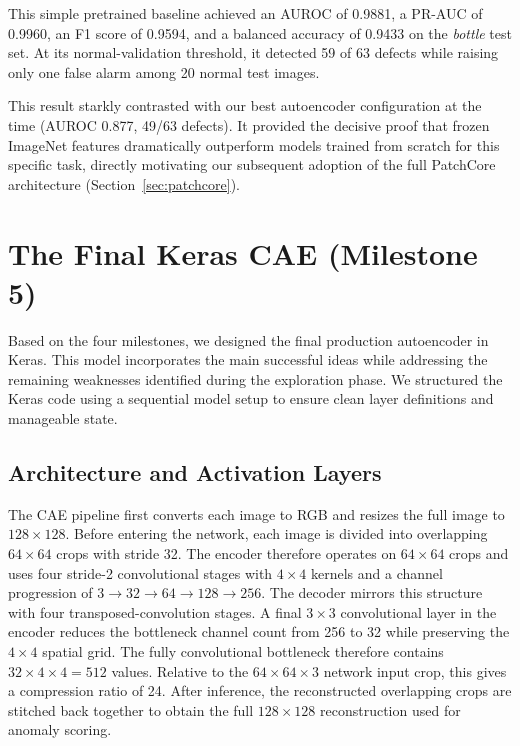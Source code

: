\documentclass[11pt, a4paper]{article}
\begin{document}
This simple pretrained baseline achieved an AUROC of 0.9881, a PR-AUC of 0.9960, an F1 score of 0.9594, and a balanced accuracy of 0.9433 on the \textit{bottle} test set. At its normal-validation threshold, it detected 59 of 63 defects while raising only one false alarm among 20 normal test images.

This result starkly contrasted with our best autoencoder configuration at the time (AUROC 0.877, 49/63 defects). It provided the decisive proof that frozen ImageNet features dramatically outperform models trained from scratch for this specific task, directly motivating our subsequent adoption of the full PatchCore architecture (Section~\ref{sec:patchcore}).



\section{The Final Keras CAE (Milestone 5)}
\label{sec:cae}

Based on the four milestones, we designed the final production autoencoder in Keras. This model incorporates the main successful ideas while addressing the remaining weaknesses identified during the exploration phase. We structured the Keras code using a sequential model setup to ensure clean layer definitions and manageable state.

\subsection{Architecture and Activation Layers}

The CAE pipeline first converts each image to RGB and resizes the full image to $128 \times 128$. Before entering the network, each image is divided into overlapping $64 \times 64$ crops with stride 32. The encoder therefore operates on $64 \times 64$ crops and uses four stride-2 convolutional stages with $4 \times 4$ kernels and a channel progression of $3 \to 32 \to 64 \to 128 \to 256$. The decoder mirrors this structure with four transposed-convolution stages. A final $3 \times 3$ convolutional layer in the encoder reduces the bottleneck channel count from 256 to 32 while preserving the $4 \times 4$ spatial grid. The fully convolutional bottleneck therefore contains $32 \times 4 \times 4 = 512$ values. Relative to the $64 \times 64 \times 3$ network input crop, this gives a compression ratio of 24. After inference, the reconstructed overlapping crops are stitched back together to obtain the full $128 \times 128$ reconstruction used for anomaly scoring.
\end{document}
